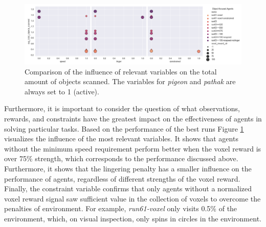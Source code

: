         \begin{figure}[!ht]
        \centering
        \includegraphics[width=1\textwidth]{images/results_variables_obj.png} 
        \caption{Comparison of the influence of relevant variables on the total amount of objects scanned. The variables for \textit{pigeon} and \textit{pathak} are always set to 1 (active).}
        \label{fig:results_variables_obj}
        \end{figure}
        
        Furthermore, it is important to consider the question of what observations, rewards, and constraints have the greatest impact on the effectiveness of agents in solving particular tasks.
        Based on the performance of the best runs Figure \ref{fig:results_variables_obj} visualizes the influence of the most relevant variables. 
        It shows that agents without the minimum speed requirement perform better when the voxel reward is over 75\% strength, which corresponds to the performance discussed above.
        Furthermore, it shows that the lingering penalty has a smaller influence on the performance of agents, regardless of different strengths of the voxel reward. Finally, the constraint variable confirms that only agents without a normalized voxel reward signal saw sufficient value in the collection of voxels to overcome the penalties of environment. For example, \textit{run61-voxel} only visits 0.5\% of the environment, which, on visual inspection, only spins in circles in the environment.
        
    
